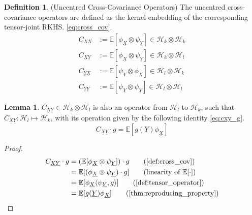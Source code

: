 \documentclass[twoside]{article} \usepackage{aistats2017}
\theoremstyle{definition}
\newtheorem{definition}[theorem]{Definition}
\newtheorem{lemma}[theorem]{Lemma}
\newcommand{\rv}[1]{\underline{#1}}
\newcommand{\expect}[1]{{\mathbb{E}[#1]}}
\newcommand{\inner}[2]{{\langle #1, #2 \rangle}}
\newcommand{\Hk}{\mathcal{H}_{k}}
\newcommand{\Hl}{\mathcal{H}_{l}}
\newcommand{\phiX}{\phi_{\rv{X}}}
\newcommand{\psiY}{\psi_{\rv{Y}}}
\newcommand{\Cxy}{C_{\rv{X} \rv{Y}}}
\newcommand{\Cyx}{C_{\rv{Y} \rv{X}}}
\newcommand{\Cxx}{C_{\rv{X} \rv{X}}}
\newcommand{\Cyy}{C_{\rv{Y} \rv{Y}}}
\begin{document}
	\begin{definition} \label{def:cross_cov}
		(Uncentred Cross-Covariance Operators)
		The uncentred cross-covariance operators are defined as the kernel embedding of the corresponding tensor-joint RKHS. \eqref{eq:cross_cov}.
		\begin{equation}
		\begin{aligned}
			\Cxx &:= \expect{\phiX \otimes \psiY} \in \Hk \otimes \Hk \\
			\Cxy &:= \expect{\phiX \otimes \psiY} \in \Hk \otimes \Hl \\
			\Cyx &:= \expect{\psiY \otimes \phiX} \in \Hl \otimes \Hk \\
			\Cyy &:= \expect{\psiY \otimes \psiY} \in \Hl \otimes \Hl 
		\label{eq:cross_cov}
		\end{aligned}
		\end{equation}		
	\end{definition}

	\begin{lemma} \label{thm:cxy_g}
		$\Cxy \in \mathcal{H}_{k} \otimes \mathcal{H}_{l}$ is also an operator from $\Hl$ to $\Hk$, such that $\Cxy : \Hl \mapsto \Hk$, with its operation given by the following identity \eqref{eq:cxy_g}.
		\begin{equation}
			\Cxy \cdot g = \expect{g(\rv{Y}) \phiX}
		\label{eq:cxy_g}
		\end{equation}
	
		\begin{proof}
		\begin{align*}
			\Cxy \cdot g &=  (\expect{\phiX \otimes \psiY}) \cdot g \tag{\cref{def:cross_cov}} \\
			&= \expect{(\phiX \otimes \psiY) \cdot g} \tag{linearity of $\expect{\cdot}$} \\
			&= \expect{\phiX \inner{\psiY}{g}} \tag{\cref{def:tensor_operator}} \\
			&= \expect{g(\rv{Y}) \phiX} \tag{\cref{thm:reproducing_property}}
		\end{align*}
		\end{proof}
	\end{lemma}
		
\end{document}
